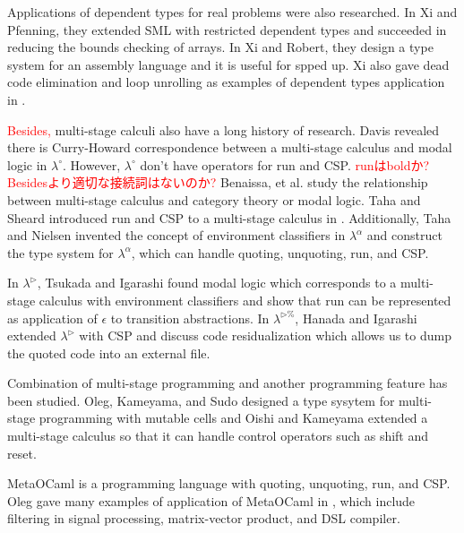 \documentclass[runningheads]{llncs}
\newcommand{\red}[1]{\textcolor{red}{#1 }}
\newcommand{\LTP}{$\lambda^{\triangleright\%}$\xspace}
\newcommand{\TW}{\triangleright}
\begin{document}

  Applications of dependent types for real problems were also researched.
  In Xi and Pfenning\cite{Xi98}, they extended SML with restricted dependent types
  and succeeded in reducing the bounds checking of arrays.
  In Xi and Robert\cite{xi2001dependently}, they design a type system for an assembly language and
  it is useful for spped up.
  Xi also gave dead code elimination and loop unrolling as examples of dependent types application in \cite{xi1999dependent}.


  \red{Besides,} multi-stage calculi also have a long history of research.
  Davis revealed there is Curry-Howard correspondence between a multi-stage calculus and modal logic in $\lambda^\circ$\cite{davies1996temporal}.
  However, $\lambda^\circ$ don't have operators for run and CSP.
  \red{runはboldか? Besidesより適切な接続詞はないのか?}
  Benaissa, et al. \cite{benaissa1999logical} study the relationship between multi-stage calculus and category theory or modal logic.
  Taha and Sheard introduced run and CSP to a multi-stage calculus in \cite{MetaML}.
  Additionally, Taha and Nielsen invented the concept of environment classifiers in $\lambda^\alpha$\cite{taha2003environment} and 
  construct the type system for $\lambda^\alpha$, which can handle quoting, unquoting, run, and CSP.

  In $\lambda^\TW$\cite{Tsukada}, Tsukada and Igarashi found modal logic which corresponds to a multi-stage calculus with environment classifiers and
  show that run can be represented as application of $\epsilon$ to transition abstractions.
  In \LTP\cite{Hanada2014}, Hanada and Igarashi extended $\lambda^\TW$ with CSP and discuss code residualization 
  which allows us to dump the quoted code into an external file.


  Combination of multi-stage programming and another programming feature has been studied.
  Oleg, Kameyama, and Sudo\cite{kiselyov2016refined} designed a type sysytem for multi-stage programming with mutable cells and
  Oishi and Kameyama\cite{oishi2017staging} extended a multi-stage calculus so that it can handle control operators such as shift and reset.


  MetaOCaml is a programming language with quoting, unquoting, run, and CSP.
  Oleg gave many examples of application of MetaOCaml in \cite{8384206}, 
  which include filtering in signal processing, matrix-vector product, and DSL compiler.
\end{document}
